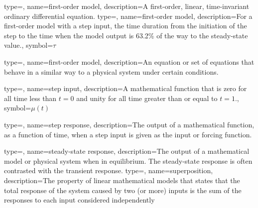 {
type=\thisgls,
name={first-order model},
description={A first-order, linear, time-invariant ordinary differential equation.}
}
{
type=\thisgls,
name={first-order model},
description={For a first-order model with a step input, the time duration from the initiation of the step to the time when the model output is 63.2\% of the way to the steady-state value.},
symbol={\ensuremath{\tau}}
}

{
type=\thisgls,
name={first-order model},
description={An equation or set of equations that behave in a similar way to a physical system under certain conditions.}
}

{
type=\thisgls,
name={step input},
description={A mathematical function that is zero for all time less than $t=0$ and unity for all time greater than or equal to $t=1$.},
symbol={\ensuremath{\mu(t)}}
}

{
type=\thisgls,
name={step response},
description={The output of a mathematical function, as a function of time, when a step input is given as the input or forcing function.}
}

{
type=\thisgls,
name={steady-state response},
description={The output of a mathematical model or physical system when in equilibrium.  The steady-state response is often contrasted with the transient response.}
}
{
type=\thisgls,
name={superposition},
description={The property of linear mathematical models that states that the total response of the system caused by two (or more) inputs is the sum of the responses to each input considered independently}
}

